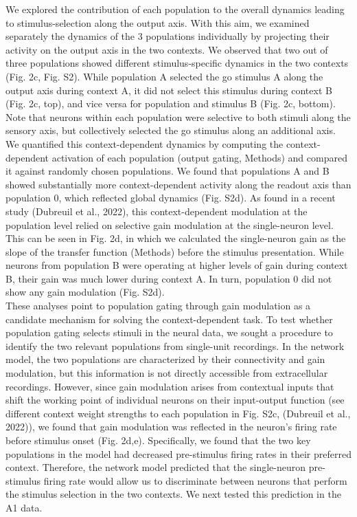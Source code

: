 \documentclass[12pt]{article}
\begin{document}
We explored the contribution of each population to the overall dynamics leading to stimulus-selection along the output axis. With this aim, we examined separately the dynamics of the 3 populations individually by projecting their activity on the output axis in the two contexts. We observed that two out of three populations showed different stimulus-specific dynamics in the two contexts (Fig. 2c, Fig. S2). While population A selected the go stimulus A along the output axis during context A, it did not select this stimulus during context B (Fig. 2c, top), and vice versa for population and stimulus B (Fig. 2c, bottom). Note that neurons within each population were selective to both stimuli along the sensory axis, but collectively selected the go stimulus along an additional axis. We quantified this context-dependent dynamics by computing the context-dependent activation of each population (output gating, Methods) and compared it against randomly chosen populations. We found that populations A and B showed substantially more context-dependent activity along the readout axis than population 0, which reflected global dynamics (Fig. S2d). As found in a recent study (Dubreuil et al., 2022), this context-dependent modulation at the population level relied on selective gain modulation at the single-neuron level. This can be seen in Fig. 2d, in which we calculated the single-neuron gain as the slope of the transfer function (Methods) before the stimulus presentation. While neurons from population B were operating at higher levels of gain during context B, their gain was much lower during context A. In turn, population 0 did not show any gain modulation (Fig. S2d). \\

These analyses point to population gating through gain modulation as a candidate mechanism for solving the context-dependent task. To test whether population gating selects stimuli in the neural data, we sought a procedure to identify the two relevant populations from single-unit recordings. In the network model, the two populations are characterized by their connectivity and gain modulation, but this information is not directly accessible from extracellular recordings. However, since gain modulation arises from contextual inputs that shift the working point of individual neurons on their input-output function (see different context weight strengths to each population in Fig. S2c, (Dubreuil et al., 2022)), we found that gain modulation was reflected in the neuron's firing rate before stimulus onset (Fig. 2d,e). Specifically, we found that the two key populations in the model had decreased pre-stimulus firing rates in their preferred context. Therefore, the network model predicted that the single-neuron pre-stimulus firing rate would allow us to discriminate between neurons that perform the stimulus selection in the two contexts. We next tested this prediction in the A1 data. \\
\end{document}
